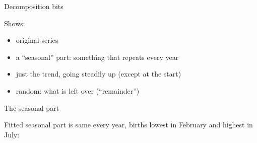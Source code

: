 \documentclass[
  ignorenonframetext,
]{beamer}
\newenvironment{Shaded}{\begin{snugshade}}{\end{snugshade}}
\newcommand{\NormalTok}[1]{#1}
\newcommand{\OperatorTok}[1]{\textcolor[rgb]{0.81,0.36,0.00}{\textbf{#1}}}
\providecommand{\tightlist}{%
  \setlength{\itemsep}{0pt}\setlength{\parskip}{0pt}}
\begin{document}
\begin{frame}{Decomposition bits}
\protect\hypertarget{decomposition-bits}{}

Shows:

\begin{itemize}
\tightlist
\item
  original series
\item
  a ``seasonal'' part: something that repeats every year
\item
  just the trend, going steadily up (except at the start)
\item
  random: what is left over (``remainder'')
\end{itemize}

\end{frame}

\begin{frame}[fragile]{The seasonal part}
\protect\hypertarget{the-seasonal-part}{}

Fitted seasonal part is same every year, births lowest in February and
highest in July:

\tiny

\begin{Shaded}
\end{Shaded}


\end{frame}
\end{document}
